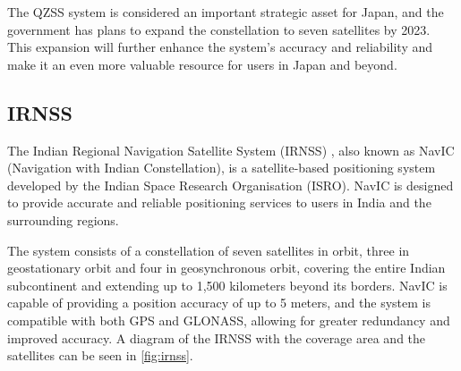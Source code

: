 The QZSS system is considered an important strategic asset for Japan, and the government has plans to expand the constellation to seven satellites by 2023. This expansion will further enhance the system's accuracy and reliability and make it an even more valuable resource for users in Japan and beyond.

\subsection{IRNSS}



The Indian Regional Navigation Satellite System (IRNSS) \cite{irnss}, also known as NavIC (Navigation with Indian Constellation), is a satellite-based positioning system developed by the Indian Space Research Organisation (ISRO). NavIC is designed to provide accurate and reliable positioning services to users in India and the surrounding regions.

The system consists of a constellation of seven satellites in orbit, three in geostationary orbit and four in geosynchronous orbit, covering the entire Indian subcontinent and extending up to 1,500 kilometers beyond its borders. NavIC is capable of providing a position accuracy of up to 5 meters, and the system is compatible with both GPS and GLONASS, allowing for greater redundancy and improved accuracy. A diagram of the IRNSS with the coverage area and the satellites can be seen in \autoref{fig:irnss}.

